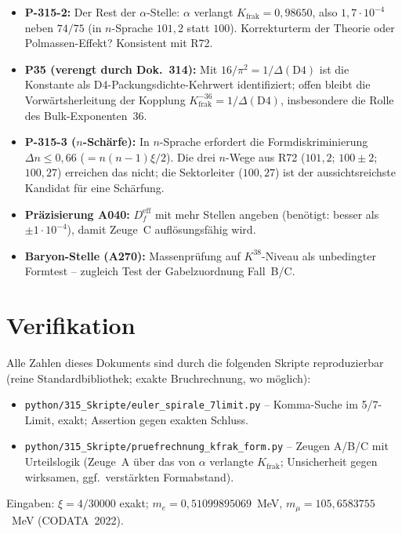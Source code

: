 \begin{itemize}
  \item \textbf{P-315-2:} Der Rest der $\alpha$-Stelle: $\alpha$ verlangt
    $K_\text{frak} = 0{,}98650$, also $1{,}7\cdot10^{-4}$ neben $74/75$
    (in $n$-Sprache $101{,}2$ statt $100$). Korrekturterm der Theorie oder
    Polmassen-Effekt? Konsistent mit R72.
  \item \textbf{P35 (verengt durch Dok.~314):} Mit
    $16/\pi^2 = 1/\Delta(\mathrm{D4})$ ist die Konstante als
    D4-Packungsdichte-Kehrwert identifiziert; offen bleibt die
    Vorw\"artsherleitung der Kopplung
    $K_\text{frak}^{-36} = 1/\Delta(\mathrm{D4})$, insbesondere die
    Rolle des Bulk-Exponenten~$36$.
  \item \textbf{P-315-3 ($n$-Sch\"arfe):} In $n$-Sprache erfordert die
    Formdiskriminierung $\Delta n \le 0{,}66$
    ($= n(n-1)\xi/2$). Die drei $n$-Wege aus R72
    ($101{,}2$; $100\pm2$; $100{,}27$) erreichen das nicht; die
    Sektorleiter ($100{,}27$) ist der aussichtsreichste Kandidat f\"ur
    eine Sch\"arfung.
  \item \textbf{Pr\"azisierung A040:} $D_f^\text{eff}$ mit mehr Stellen
    angeben (ben\"otigt: besser als $\pm1\cdot10^{-4}$), damit Zeuge~C
    aufl\"osungsf\"ahig wird.
  \item \textbf{Baryon-Stelle (A270):} Massenpr\"ufung auf
    $K^{38}$-Niveau als unbedingter Formtest -- zugleich Test der
    Gabelzuordnung Fall~B/C.
\end{itemize}

\section{Verifikation}

Alle Zahlen dieses Dokuments sind durch die folgenden Skripte reproduzierbar
(reine Standardbibliothek; exakte Bruchrechnung, wo m\"oglich):

\begin{itemize}
  \item \texttt{python/315\_Skripte/euler\_spirale\_7limit.py} --
    Komma-Suche im 5/7-Limit, exakt; Assertion gegen exakten Schluss.
  \item \texttt{python/315\_Skripte/pruefrechnung\_kfrak\_form.py} --
    Zeugen A/B/C mit Urteilslogik (Zeuge~A über das von $\alpha$ verlangte $K_\text{frak}$; Unsicherheit gegen wirksamen,
    ggf.\ verst\"arkten Formabstand).
\end{itemize}

Eingaben: $\xi=4/30000$ exakt; $m_e = 0{,}51099895069$~MeV,
$m_\mu = 105{,}6583755$~MeV (CODATA~2022).
